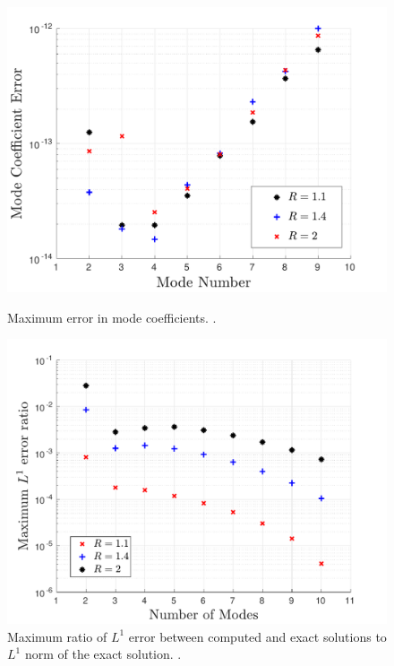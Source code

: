 \begin{figure}[ht]
\centerline{\includegraphics[width=0.9\linewidth]{06-appendix/SpectralMethodBoltzmann/Figures/keq_b_err.pdf}}
\caption{Maximum error in mode coefficients. .}\label{fig:keq_b_err}
\centerline{\includegraphics[width=0.9\linewidth]{06-appendix/SpectralMethodBoltzmann/Figures/keq_L1_err.pdf}}
\caption{Maximum ratio of $L^1$ error between computed and exact solutions to $L^1$ norm of the exact solution. .}\label{fig:keq_L1_err}
\end{figure}


